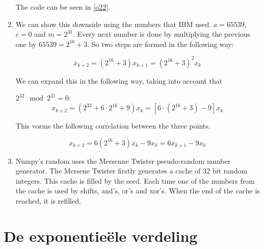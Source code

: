 \documentclass[a4paper,12px]{article}
\begin{document}
\begin{enumerate}
        The code can be seen in \autoref{o22}.
    \item %
        We can show this downside using the numbers that IBM used. $a=65539$,
        $c=0$ and $m=2^{31}$. Every next number is done by multiplying the
        previous one by $65539=2^{16}+3$. So two steps are formed in the
        following way:

        \begin{equation}x_{k+2}=(2^{16}+3) x_{k+1}=(2^{16}+3 )^2 x_{k}\,\end{equation}

        We can expand this in the following way, taking into account that

        $2^{32}\mod2^{31}=0$:
        \begin{equation}x_{k+2}=(2^{32}+6 \cdot2^{16} +9 )x_{k}=[6 \cdot (2^{16}+3)-9]x_{k}\,\end{equation}

        This vorms the following correlation between the three points.

        \begin{equation}x_{k+2}=6(2^{16}+3)x_{k}-9x_{k}=6x_{k+1}-9x_{k}\,\end{equation}
    \item Numpy's random uses the Mersenne Twister pseudo-random number generator.
        The Mersene Twister firstly generates a cache of 32 bit random
        integers. This cache is filled by the seed. Each time one of the
        numbers from the cache is used by shifts, and's, or's and xor's.
        When the end of the cache is reached, it is refilled.
\end{enumerate}
\section{De exponentie\"ele verdeling}
\end{document}
